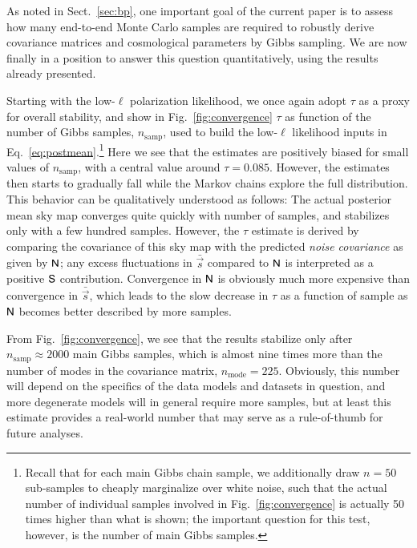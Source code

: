 \documentclass[twocolumn]{aa}
\newcommand{\s}[0]{\vec{s}}
\newcommand{\N}[0]{\tens{N}}
\renewcommand{\S}[0]{\tens{S}}
\begin{document}
As noted in Sect.~\ref{sec:bp}, one important goal of the current
paper is to assess how many end-to-end Monte Carlo samples are
required to robustly derive covariance matrices and cosmological
parameters by Gibbs sampling. We are now finally in a position to
answer this question quantitatively, using the results already
presented.

Starting with the low-$\ell$ polarization likelihood, we once again
adopt $\tau$ as a proxy for overall stability, and show in
Fig.~\ref{fig:convergence} $\tau$ as function of the number of Gibbs
samples, $n_{\mathrm{samp}}$, used to build the low-$\ell$ likelihood
inputs in Eq.~\ref{eq:postmean}.\footnote{Recall that for each main
  Gibbs chain sample, we additionally draw $n=50$ sub-samples to
  cheaply marginalize over white noise, such that the actual number of
  individual samples involved in Fig.~\ref{fig:convergence} is
  actually 50 times higher than what is shown; the important question
  for this test, however, is the number of main Gibbs samples.} Here
we see that the estimates are positively biased for small values of
$n_{\mathrm{samp}}$, with a central value around
$\tau=0.085$. However, the estimates then starts to gradually fall
while the Markov chains explore the full distribution. This behavior
can be qualitatively understood as follows: The actual posterior mean
sky map converges quite quickly with number of samples, and stabilizes
only with a few hundred samples. However, the $\tau$ estimate is
derived by comparing the covariance of this sky map with the predicted
\emph{noise covariance} as given by $\N$; any excess fluctuations in
$\bar{\s}$ compared to $\N$ is interpreted as a positive $\S$
contribution. Convergence in $\N$ is obviously much more expensive 
than convergence in $\bar{\s}$, which leads to the slow decrease in 
$\tau$ as a function of sample as $\N$ becomes better 
described by more samples.

From Fig.~\ref{fig:convergence}, we see that the results stabilize
only after $n_{\mathrm{samp}}\approx 2000$ main Gibbs samples, which
is almost nine times more than the number of modes in the covariance
matrix, $n_{\mathrm{mode}}=225$. Obviously, this number will depend on
the specifics of the data models and datasets in question, and more
degenerate models will in general require more samples, but at least
this estimate provides a real-world number that may serve as a
rule-of-thumb for future analyses.
\end{document}
